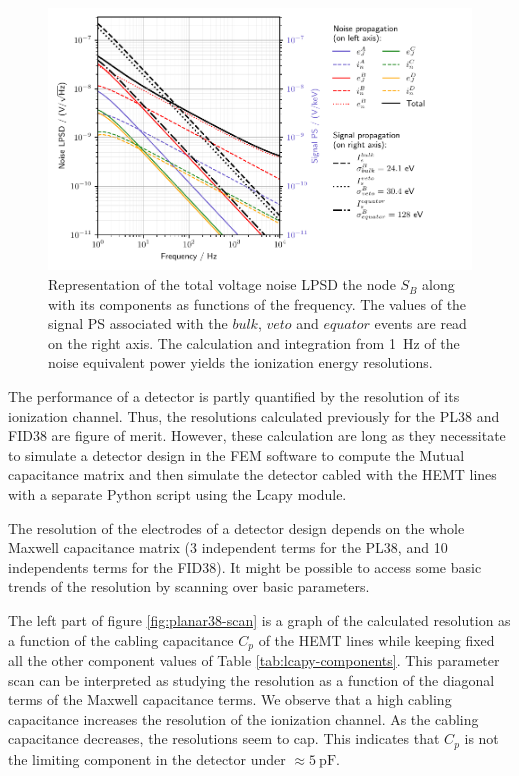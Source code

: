\begin{figure}
\centering
\includegraphics[scale=1]{Figures/Electrodes/fid38_noise_propagation.pdf}
\caption{Representation of the total voltage noise LPSD the node $S_B$ along with its components as functions of the frequency. The values of the signal PS associated with the $bulk$, $veto$ and $equator$ events are read on the right axis. The calculation and integration from \SI{1}{\Hz} of the noise equivalent power yields the ionization energy resolutions.
}
\label{fig:fid38-propagation}
\end{figure}

The performance of a detector is partly quantified by the resolution of its ionization channel. Thus, the resolutions calculated previously for the PL38 and FID38 are figure of merit. However, these calculation are long as they necessitate to simulate a detector design in the FEM software to compute the Mutual capacitance matrix and then simulate the detector cabled with the HEMT lines with a separate Python script using the Lcapy module.

The resolution of the electrodes of a detector design depends on the whole Maxwell capacitance matrix (3 independent terms for the PL38, and 10 independents terms for the FID38). It might be possible to access some basic trends of the resolution by scanning over basic parameters.

The left part of figure \ref{fig:planar38-scan} is a graph of the calculated resolution as a function of the cabling capacitance $C_p$ of the HEMT lines while keeping fixed all the other component values of Table \ref{tab:lcapy-components}. This parameter scan can be interpreted as studying the resolution as a function of the diagonal terms of the Maxwell capacitance terms. We observe that a high cabling capacitance increases the resolution of the ionization channel. As the cabling capacitance decreases, the resolutions seem to cap. This indicates that $C_p$ is not the limiting component in the detector under $\approx \SI{5}{\pico\farad}$.

